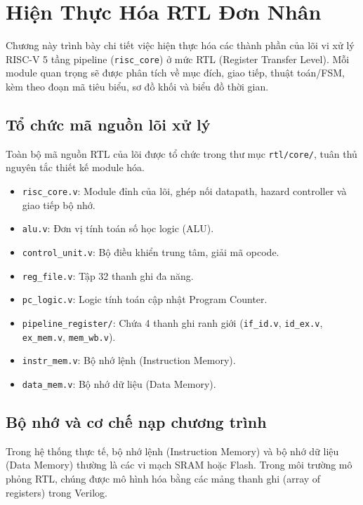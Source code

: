 \chapter{Hiện Thực Hóa RTL Đơn Nhân}
\label{chap:implementation_core}

Chương này trình bày chi tiết việc hiện thực hóa các thành phần của lõi vi xử lý RISC-V 5 tầng pipeline (\texttt{risc\_core}) ở mức RTL (Register Transfer Level). Mỗi module quan trọng sẽ được phân tích về mục đích, giao tiếp, thuật toán/FSM, kèm theo đoạn mã tiêu biểu, sơ đồ khối và biểu đồ thời gian.

\section{Tổ chức mã nguồn lõi xử lý}
Toàn bộ mã nguồn RTL của lõi được tổ chức trong thư mục \texttt{rtl/core/}, tuân thủ nguyên tắc thiết kế module hóa.
\begin{itemize}
    \item \texttt{risc\_core.v}: Module đỉnh của lõi, ghép nối datapath, hazard controller và giao tiếp bộ nhớ.
    \item \texttt{alu.v}: Đơn vị tính toán số học logic (ALU).
    \item \texttt{control\_unit.v}: Bộ điều khiển trung tâm, giải mã opcode.
    \item \texttt{reg\_file.v}: Tập 32 thanh ghi đa năng.
    \item \texttt{pc\_logic.v}: Logic tính toán cập nhật Program Counter.
    \item \texttt{pipeline\_register/}: Chứa 4 thanh ghi ranh giới (\texttt{if\_id.v}, \texttt{id\_ex.v}, \texttt{ex\_mem.v}, \texttt{mem\_wb.v}).
    \item \texttt{instr\_mem.v}: Bộ nhớ lệnh (Instruction Memory).
    \item \texttt{data\_mem.v}: Bộ nhớ dữ liệu (Data Memory).
\end{itemize}

\section{Bộ nhớ và cơ chế nạp chương trình}
Trong hệ thống thực tế, bộ nhớ lệnh (Instruction Memory) và bộ nhớ dữ liệu (Data Memory) thường là các vi mạch SRAM hoặc Flash. Trong môi trường mô phỏng RTL, chúng được mô hình hóa bằng các mảng thanh ghi (array of registers) trong Verilog. 


